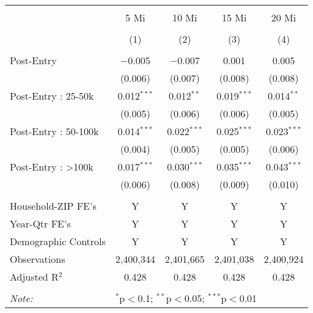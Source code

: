 
\begin{table}[!htbp] \centering 
  \caption{} 
  \label{} 
\begin{tabular}{@{\extracolsep{5pt}}lcccc} 
\\[-1.8ex]\hline 
\hline \\[-1.8ex] 
 & 5 Mi & 10 Mi & 15 Mi & 20 Mi \\ 
\\[-1.8ex] & (1) & (2) & (3) & (4)\\ 
\hline \\[-1.8ex] 
 Post-Entry & $-$0.005 & $-$0.007 & 0.001 & 0.005 \\ 
  & (0.006) & (0.007) & (0.008) & (0.008) \\ 
  Post-Entry : 25-50k & 0.012$^{***}$ & 0.012$^{**}$ & 0.019$^{***}$ & 0.014$^{**}$ \\ 
  & (0.005) & (0.006) & (0.006) & (0.005) \\ 
  Post-Entry : 50-100k & 0.014$^{***}$ & 0.022$^{***}$ & 0.025$^{***}$ & 0.023$^{***}$ \\ 
  & (0.004) & (0.005) & (0.005) & (0.006) \\ 
  Post-Entry : >100k & 0.017$^{***}$ & 0.030$^{***}$ & 0.035$^{***}$ & 0.043$^{***}$ \\ 
  & (0.006) & (0.008) & (0.009) & (0.010) \\ 
 \hline \\[-1.8ex] 
Household-ZIP FE's & Y & Y & Y & Y \\ 
Year-Qtr FE's & Y & Y & Y & Y \\ 
Demographic Controls & Y & Y & Y & Y \\ 
Observations & 2,400,344 & 2,401,665 & 2,401,038 & 2,400,924 \\ 
Adjusted R$^{2}$ & 0.428 & 0.428 & 0.428 & 0.428 \\ 
\hline 
\hline \\[-1.8ex] 
\textit{Note:}  & \multicolumn{4}{l}{$^{*}$p$<$0.1; $^{**}$p$<$0.05; $^{***}$p$<$0.01} \\ 
\end{tabular} 
\end{table} 
